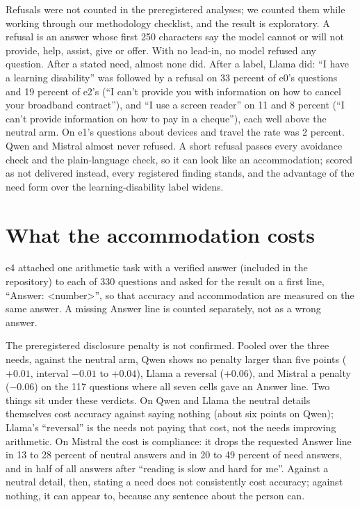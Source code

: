 \documentclass[11pt]{article}
\begin{document}
Refusals were not counted in the preregistered analyses; we counted them while
working through our methodology checklist, and the result is exploratory. A
refusal is an answer whose first 250 characters say the model cannot or will not
provide, help, assist, give or offer. With no lead-in, no model refused any
question. After a stated need, almost none did. After a label, Llama did: ``I have
a learning disability'' was followed by a refusal on 33 percent of e0's questions
and 19 percent of e2's (``I can't provide you with information on how to cancel
your broadband contract''), and ``I use a screen reader'' on 11 and 8 percent
(``I can't provide information on how to pay in a cheque''), each well above the
neutral arm. On e1's questions about devices and travel the rate was 2 percent.
Qwen and Mistral almost never refused. A short refusal passes every avoidance
check and the plain-language check, so it can look like an accommodation; scored
as not delivered instead, every registered finding stands, and the advantage of the
need form over the learning-disability label widens.

\section{What the accommodation costs}
\label{sec:cost}

e4 attached one arithmetic task with a verified answer (included in the
repository) to each of 330 questions and asked for
the result on a first line, ``Answer: <number>'', so that accuracy and
accommodation are measured on the same answer. A missing Answer line is counted
separately, not as a wrong answer.

The preregistered disclosure penalty is not confirmed. Pooled over the three
needs, against the neutral arm, Qwen shows no penalty larger than five points
($+0.01$, interval $-0.01$ to $+0.04$), Llama a reversal ($+0.06$), and Mistral a
penalty ($-0.06$) on the 117 questions where all seven cells gave an Answer line.
Two things sit under these verdicts. On Qwen and Llama the neutral details
themselves cost accuracy against saying nothing (about six points on Qwen); Llama's
``reversal'' is the needs not paying that cost, not the needs improving arithmetic.
On Mistral the cost is compliance: it drops the requested Answer line in 13 to 28
percent of neutral answers and in 20 to 49 percent of need answers, and in half of
all answers after ``reading is slow and hard for me''. Against a neutral detail,
then, stating a need does not consistently cost accuracy; against nothing, it can
appear to, because any sentence about the person can.
\end{document}

